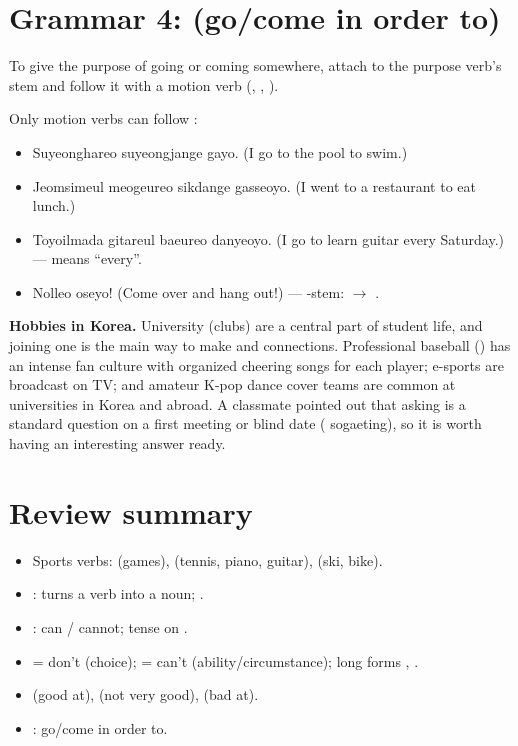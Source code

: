 \section{Grammar 4:  (go/come in order to)}

To give the purpose of going or coming somewhere, attach  to the purpose
verb's stem and follow it with a motion verb (, , ).

\begin{example}[Purpose]
Only motion verbs can follow :
\begin{itemize}
  \item {} Suyeonghareo suyeongjange gayo. (I go to the pool to
        swim.)
  \item {} Jeomsimeul meogeureo sikdange gasseoyo. (I went
        to a restaurant to eat lunch.)
  \item {} Toyoilmada gitareul baeureo danyeoyo. (I go
        to learn guitar every Saturday.) ---  means ``every''.
  \item {} Nolleo oseyo! (Come over and hang out!) --- -stem:
         $\to$ .
\end{itemize}
\end{example}

\begin{aside}
\textbf{Hobbies in Korea.} University  (clubs) are a central part of student
life, and joining one is the main way to make  and  connections.
Professional baseball () has an intense fan culture with organized cheering
songs for each player; e-sports are broadcast on TV; and amateur K-pop dance cover teams
are common at universities in Korea and abroad. A classmate pointed out that asking
 is a standard question on a first meeting or blind date
( sogaeting), so it is worth having an interesting answer ready.
\end{aside}

\section*{Review summary}
\begin{itemize}
  \item Sports verbs:  (games),  (tennis, piano, guitar), 
        (ski, bike).
  \item {}: turns a verb into a noun; .
  \item {}: can / cannot; tense on .
  \item {} = don't (choice);  = can't (ability/circumstance); long forms
        , .
  \item {} (good at),  (not very good),  (bad at).
  \item {}: go/come in order to.
\end{itemize}
